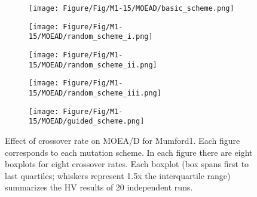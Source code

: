 \begin{figure}[!htbp]
	\centering
	\begin{subfigure}[b]{0.52\textwidth}
		\texttt{[image: Figure/Fig/M1-15/MOEAD/basic\_scheme.png]}
	\end{subfigure}%
	\begin{subfigure}[b]{0.52\textwidth}
		\texttt{[image: Figure/Fig/M1-15/MOEAD/random\_scheme\_i.png]}
	\end{subfigure}%
	\newline
	\begin{subfigure}[b]{0.52\textwidth}
		\texttt{[image: Figure/Fig/M1-15/MOEAD/random\_scheme\_ii.png]}
	\end{subfigure}%
	\begin{subfigure}[b]{0.52\textwidth}
		\texttt{[image: Figure/Fig/M1-15/MOEAD/random\_scheme\_iii.png]}
	\end{subfigure}%
	\newline
	\begin{subfigure}[b]{0.52\textwidth}
		\texttt{[image: Figure/Fig/M1-15/MOEAD/guided\_scheme.png]}
	\end{subfigure}%
	\caption{Effect of crossover rate on MOEA/D for Mumford1. Each figure corresponds to each mutation scheme. In each figure there are eight boxplots for eight crossover rates.  Each boxplot (box spans first to last quartiles; whiskers represent 1.5x the interquartile range) summarizes the HV results of 20 independent runs.}
	\label{fig:cr_m1_moead}
\end{figure}
